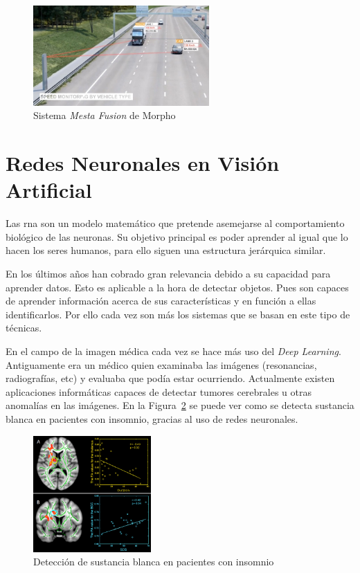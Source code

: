 \begin{figure}[H]
  \begin{center}
    \includegraphics[width=0.6\textwidth]{figures/Introduccion/mesta_fusion.jpg}
		\caption{Sistema \textit{Mesta Fusion} de Morpho}
		\label{fig.mesta_fusion}
		\end{center}
\end{figure}

\section{Redes Neuronales en Visión Artificial}

Las \acrfull{rna} son un modelo matemático que pretende asemejarse al comportamiento biológico de las neuronas. Su objetivo principal es poder aprender al igual que lo hacen los seres humanos, para ello siguen una estructura jerárquica similar.

En los últimos años han cobrado gran relevancia debido a su capacidad para aprender datos. Esto es aplicable a la hora de detectar objetos. Pues son capaces de aprender información acerca de sus características y en función a ellas identificarlos. Por ello cada vez son más los sistemas que se basan en este tipo de técnicas. 

En el campo de la imagen médica cada vez se hace más uso del \textit{Deep Learning}. Antiguamente era un médico quien examinaba las imágenes (resonancias, radiografías, etc) y evaluaba que podía estar ocurriendo. Actualmente existen aplicaciones informáticas capaces de detectar tumores cerebrales u otras anomalías en las imágenes. En la Figura~\ref{fig.imagen_medica} se puede ver como se detecta sustancia blanca en pacientes con insomnio, gracias al uso de redes neuronales.

\begin{figure}[H]
  \begin{center}
    \includegraphics[width=0.4\textwidth]{figures/Introduccion/imagen_medica.jpg}
		\caption{Detección de sustancia blanca en pacientes con insomnio}
		\label{fig.imagen_medica}
		\end{center}
\end{figure}

